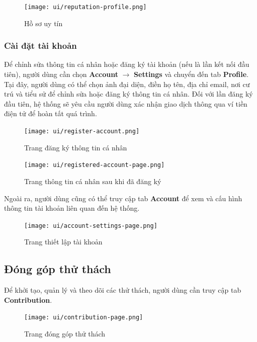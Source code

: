 \begin{figure}[H]
  \centering
  \texttt{[image: ui/reputation-profile.png]}
  \caption{Hồ sơ uy tín}
  \label{fig:reputation-profile}
\end{figure}

\subsubsection{Cài đặt tài khoản}

Để chỉnh sửa thông tin cá nhân hoặc đăng ký tài khoản (nếu là lần kết nối đầu tiên), người dùng cần chọn \textbf{Account} $\rightarrow$ \textbf{Settings} và chuyển đến tab \textbf{Profile}.
Tại đây, người dùng có thể chọn ảnh đại diện, điền họ tên, địa chỉ email, nơi cư trú và tiểu sử để chỉnh sửa hoặc đăng ký thông tin cá nhân.  
Đối với lần đăng ký đầu tiên, hệ thống sẽ yêu cầu người dùng xác nhận giao dịch thông qua ví tiền điện tử để hoàn tất quá trình.

\begin{figure}[H]
  \centering
  \texttt{[image: ui/register-account.png]}
  \caption{Trang đăng ký thông tin cá nhân}
  \label{fig:register-account}
\end{figure}

\begin{figure}[H]
  \centering
  \texttt{[image: ui/registered-account-page.png]}
  \caption{Trang thông tin cá nhân sau khi đã đăng ký}
  \label{fig:registered-account-page}
\end{figure}

Ngoài ra, người dùng cũng có thể truy cập tab \textbf{Account} để xem và cấu hình thông tin tài khoản liên quan đến hệ thống.

\begin{figure}[H]
  \centering
  \texttt{[image: ui/account-settings-page.png]}
  \caption{Trang thiết lập tài khoản}
  \label{fig:account-settings-page}
\end{figure}

\subsection{Đóng góp thử thách}

Để khởi tạo, quản lý và theo dõi các thử thách, người dùng cần truy cập tab \textbf{Contribution}.

\begin{figure}[H]
  \centering
  \texttt{[image: ui/contribution-page.png]}
  \caption{Trang đóng góp thử thách}
  \label{fig:contribution-page}
\end{figure}

